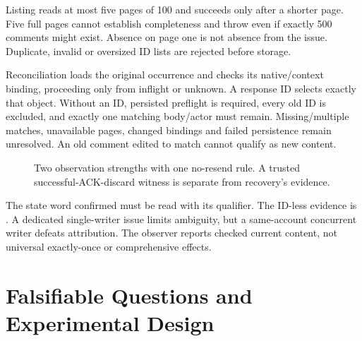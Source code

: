 \documentclass[11pt,letterpaper]{article}
\begin{document}
Listing reads at most five pages of 100 and succeeds only after a shorter page.
Five full pages cannot establish completeness and throw even if exactly 500
comments might exist. Absence on page one is not absence from the issue.
Duplicate, invalid or oversized ID lists are rejected before storage.

Reconciliation loads the original occurrence and checks its native/context
binding, proceeding only from inflight or unknown. A response ID selects exactly
that object. Without an ID, persisted preflight is required, every old ID is
excluded, and exactly one matching body/actor must remain. Missing/multiple
matches, unavailable pages, changed bindings and failed persistence remain
unresolved. An old comment edited to match cannot qualify as new content.

\begin{figure}[tbp]
\centering
{}
\caption{Two observation strengths with one no-resend rule. A trusted
successful-ACK-discard witness is separate from recovery's evidence.}
\label{fig:recovery}
\end{figure}

The state word confirmed must be read with its qualifier. The ID-less evidence
is .
A dedicated single-writer issue limits ambiguity, but a same-account concurrent
writer defeats attribution. The observer reports checked current content, not
universal exactly-once or comprehensive effects.

\section{Falsifiable Questions and Experimental Design}
\end{document}
